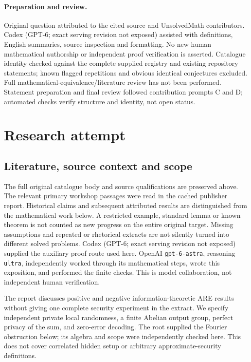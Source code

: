 \documentclass[11pt]{article}
\begin{document}
\paragraph{Preparation and review.}
Original question attributed to the cited source and UnsolvedMath contributors. Codex (GPT-6; exact serving revision not exposed) assisted with definitions, English summaries, source inspection and formatting. No new human mathematical authorship or independent proof verification is asserted. Catalogue identity checked against the complete supplied registry and existing repository statements; known flagged repetitions and obvious identical conjectures excluded. Full mathematical-equivalence/literature review has not been performed. Statement preparation and final review followed contribution prompts C and D; automated checks verify structure and identity, not open status.
\label{end:statement}

\section{Research attempt}
\subsection{Literature, source context and scope}
The full original catalogue body and source qualifications are preserved above. The relevant primary workshop passages were read in the cached publisher report. Historical claims and subsequent attributed results are distinguished from the mathematical work below. A restricted example, standard lemma or known theorem is not counted as new progress on the entire original target. Missing assumptions and repeated or rhetorical extracts are not silently turned into different solved problems.
Codex (GPT-6; exact serving revision not exposed) supplied the auxiliary proof route used here. OpenAI \texttt{gpt-6-astra}, reasoning \texttt{ultra}, independently worked through its mathematical steps, wrote this exposition, and performed the finite checks. This is model collaboration, not independent human verification.

The report discusses positive and negative information-theoretic ARE results without giving one complete security experiment in the extract. We specify independent private local randomness, a finite Abelian output group, perfect privacy of the sum, and zero-error decoding. The root supplied the Fourier obstruction below; its algebra and scope were independently checked here. This does not cover correlated hidden setup or arbitrary approximate-security definitions.
\end{document}
